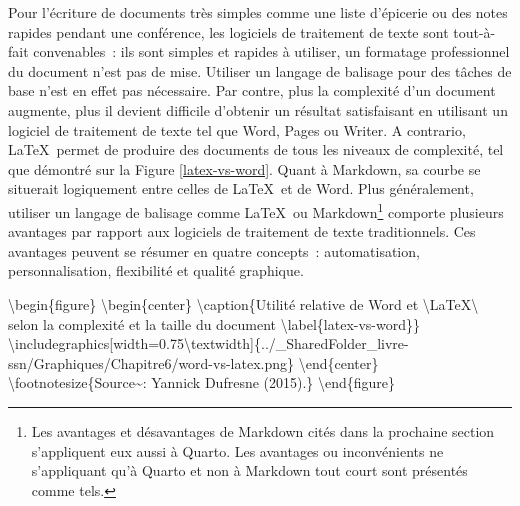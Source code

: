 \documentclass[
  letterpaper,
]{scrbook}
\begin{document}
Pour l'écriture de documents très simples comme une liste d'épicerie ou
des notes rapides pendant une conférence, les logiciels de traitement de
texte sont tout-à-fait convenables~: ils sont simples et rapides à
utiliser, un formatage professionnel du document n'est pas de mise.
Utiliser un langage de balisage pour des tâches de base n'est en effet
pas nécessaire. Par contre, plus la complexité d'un document augmente,
plus il devient difficile d'obtenir un résultat satisfaisant en
utilisant un logiciel de traitement de texte tel que Word, Pages ou
Writer. A contrario, \LaTeX~permet de produire des documents de tous les
niveaux de complexité, tel que démontré sur la Figure
\ref{latex-vs-word}. Quant à Markdown, sa courbe se situerait
logiquement entre celles de \LaTeX~et de Word. Plus généralement,
utiliser un langage de balisage comme \LaTeX~ou Markdown\footnote{Les
  avantages et désavantages de Markdown cités dans la prochaine section
  s'appliquent eux aussi à Quarto. Les avantages ou inconvénients ne
  s'appliquant qu'à Quarto et non à Markdown tout court sont présentés
  comme tels.} comporte plusieurs avantages par rapport aux logiciels de
traitement de texte traditionnels. Ces avantages peuvent se résumer en
quatre concepts~: automatisation, personnalisation, flexibilité et
qualité graphique.

\textbackslash begin\{figure\} \textbackslash begin\{center\}
\textbackslash caption\{Utilité relative de Word et
\textbackslash LaTeX\textbackslash{} selon la complexité et la taille du
document \textbackslash label\{latex-vs-word\}\}
\textbackslash includegraphics{[}width=0.75\textbackslash textwidth{]}\{../\_SharedFolder\_livre-ssn/Graphiques/Chapitre6/word-vs-latex.png\}
\textbackslash end\{center\}
\textbackslash footnotesize\{Source\textasciitilde: Yannick Dufresne
(2015).\} \textbackslash end\{figure\}
\end{document}
